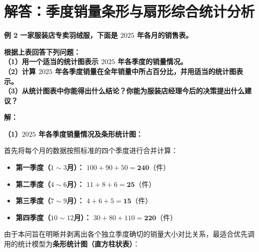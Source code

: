 \newpage



\section{解答：季度销量条形与扇形综合统计分析}

\vspace{0.6cm}

\textbf{例 2 \quad 一家服装店专卖羽绒服，下面是 $2025$ 年各月的销售表。}

\vspace{0.2cm}
\begin{center}
\renewcommand{\arraystretch}{1.6}
\end{center}

\vspace{0.4cm}

\textbf{根据上表回答下列问题：\\
（1）用一个适当的统计图表示 $2025$ 年各季度的销量情况。\\
（2）计算 $2025$ 年各季度销量在全年销量中所占百分比，并用适当的统计图表示。\\
（3）从统计图表中你能得出什么结论？你能为服装店经理今后的决策提出什么建议？}

\vspace{0.4cm}
\textbf{解：}

\textbf{（1）$2025$ 年各季度销量情况及条形统计图：}

\vspace{0.2cm}
首先将每个月的数据按照标准的四个季度进行合并计算：
\begin{itemize}
    \item \textbf{第一季度（$1{\sim}3$月）：} $100 + 90 + 50 = \boldsymbol{240}$（件）
    \item \textbf{第二季度（$4{\sim}6$月）：} $11 + 8 + 6 = \boldsymbol{25}$（件）
    \item \textbf{第三季度（$7{\sim}9$月）：} $4 + 6 + 5 = \boldsymbol{15}$（件）
    \item \textbf{第四季度（$10{\sim}12$月）：} $30 + 80 + 110 = \boldsymbol{220}$（件）
\end{itemize}
由于本问旨在明晰并剥离出各个独立季度确切的销量大小对比关系，最适合优先调用的统计模型为\textbf{条形统计图（直方柱状表）}：

